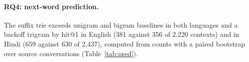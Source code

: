 \paragraph{RQ4: next-word prediction.}
The suffix trie exceeds unigram and bigram baselines in both languages and a backoff trigram by \PredDENOneTri{} hit@1 in English (381 against 356 of 2,220 contexts) and \PredDHIOneTri{} in Hindi (659 against 630 of 2,437), computed from counts with a paired bootstrap over source conversations (Table~\ref{tab:pred}).
